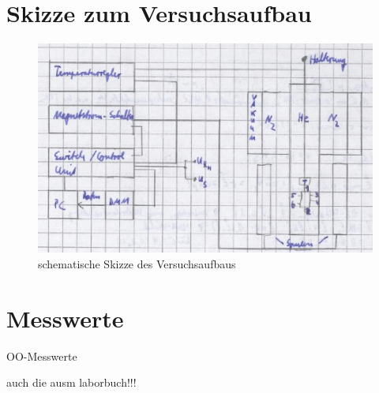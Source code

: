 \newpage

\onecolumn

\appendix

\section{Skizze zum Versuchsaufbau}
\label{sec:aufbau}
\begin{figure}[htb]
   \centering
   \includegraphics[width=1\columnwidth,keepaspectratio]{aufbau}
   \caption{schematische Skizze des Versuchsaufbaus}
\end{figure}

\section{Messwerte}
\label{sec:messwerte}
OO-Messwerte

auch die ausm laborbuch!!!

